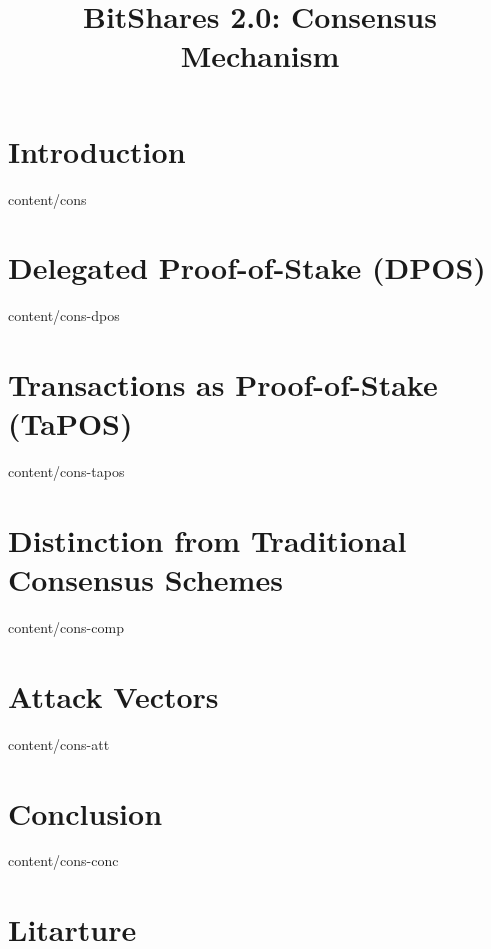 \documentclass{btswhitepaper}
\title{BitShares 2.0: Consensus Mechanism}
\begin{document}
\maketitle

\begin{abstract}%
\end{abstract}
\section    { Introduction                                   }  { content/cons          } 
\section    { Delegated Proof-of-Stake (DPOS)                }  { content/cons-dpos     } 
\section    { Transactions as Proof-of-Stake (TaPOS)         }  { content/cons-tapos    } 
\section    { Distinction from Traditional Consensus Schemes }  { content/cons-comp     } 
\section    { Attack Vectors                                 }  { content/cons-att      } 
\section    { Conclusion                                     }  { content/cons-conc     } 
\section*   { Litarture                                      }
\nocite{*}


\end{document}
